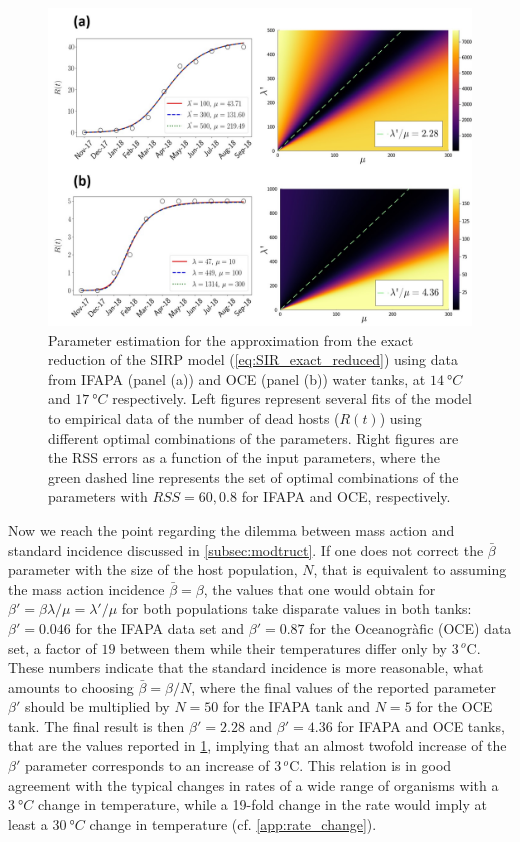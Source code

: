 \begin{figure}[H]
    \centering
    \includegraphics[width=1\textwidth]{Figures/exact_SIR_fitting.jpg}
    \caption{Parameter estimation for the approximation from the exact
        reduction of the SIRP model (\cref{eq:SIR_exact_reduced}) using data
        from IFAPA
        (panel (a)) and OCE (panel (b)) water tanks, at $\SI{14}{\degree C}$
        and
        $\SI{17}{\degree C}$ respectively. Left figures represent several fits
        of the
        model to empirical data of the number of dead hosts ($R(t)$) using
        different
        optimal combinations of the parameters. Right figures are the RSS
        errors as a
        function of the input parameters, where the green dashed line
        represents the
        set of optimal combinations of the parameters with $RSS=60, 0.8$ for
        IFAPA and
        OCE, respectively.}
    \label{fig: exact_SIR_fit}
\end{figure}

Now we reach the point regarding the dilemma between mass action and
standard incidence discussed in \cref{subsec:modtruct}. If one does not correct
the $\bar{\beta}$ parameter with the size of the host population, $N$, that is
equivalent to assuming the mass action incidence $\bar{\beta}=\beta$, the
values that one would obtain for $\beta'=\beta\lambda/\mu=\lambda'/\mu$ for
both populations take disparate values in both tanks: $\beta'=0.046$ for the
IFAPA data set and $\beta'=0.87$ for the Oceanogràfic (OCE) data set, a factor
of $19$ between them while their temperatures differ only by $3\,{}^o$C.
These numbers indicate that the standard incidence is more reasonable, what
amounts to choosing $\bar{\beta}=\beta/N$, where the final values of the
reported parameter $\beta'$ should be multiplied by $N=50$ for the IFAPA tank
and $N=5$ for the OCE tank. The final result is then $\beta'=2.28$ and
$\beta'=4.36$ for IFAPA and OCE tanks, that are the values reported in
\cref{fig: exact_SIR_fit}, implying that an almost twofold increase of the
$\beta'$ parameter corresponds to an increase of $3\,{}^o$C. This relation is
in good agreement with the typical changes in rates of a wide range of
organisms with a $\SI{3}{\degree C}$ change in temperature, while a 19-fold
change in the rate would imply at least a $\SI{30}{\degree C}$ change in
temperature (cf. \ref{app:rate_change}).

